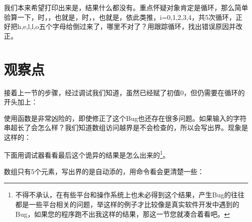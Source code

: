

我们本来希望打印出来是，结果什么都没有。重点怀疑对象肯定是循环，那么简单验算一下，时，，也就是，时，，也就是，依此类推，i=\BookSplit{}0,1,2,3,4，共5次循环，正好把h,e,l,l,o五个字母给倒过来了，哪里不对了？用跟踪循环，找出错误原因并改正。




\section{观察点}
%
接着上一节的步骤，经过调试我们知道，虽然已经赋了初值0，但仍需要在循环的开头加上：





使用函数是非常凶险的，即使修正了这个Bug也还存在很多问题。如果输入的字符串超长了会怎么样？我们知道数组访问越界是不会检查的，所以会写出界。现象是这样的：




下面用调试器看看最后这个诡异的结果是怎么出来的\footnote[21]{不得不承认，在有些平台和操作系统上也未必得到这个结果，产生Bug的往往都是一些平台相关的问题，举这样的例子才比较像是真实软件开发中遇到的Bug，如果您的程序跑不出我这样的结果，那这一节您就凑合着看吧。}。




数组只有5个元素，写出界的是自动添的，用命令看会更清楚一些：


